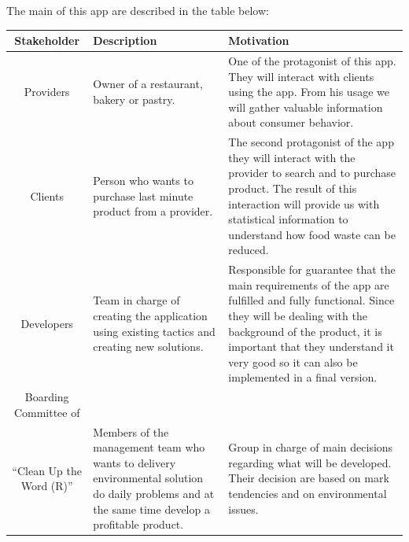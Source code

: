 The main  of this app are described in the table below:

\begin{table}[H]
    \begin{tabularx}{\textwidth}{cXX}
    \toprule
    Stakeholder & Description & Motivation  \\
    \midrule
    Providers & Owner of a restaurant, bakery or pastry. & One of the protagonist of this app. They will interact
    with clients using the app. From his usage we will gather valuable information about consumer behavior. \\
    Clients & Person who wants to purchase last minute product from a provider. & The second protagonist of the app
    they will interact with the provider to search and to purchase product. The result of this interaction will
    provide us with statistical information to understand how food waste can be reduced.  \\
    Developers & Team in charge of creating the application using existing tactics and creating new solutions.
    & Responsible for guarantee that the main requirements of the app are fulfilled and fully functional. 
    Since they will be dealing with the background of the product, it is important that they understand it very
    good so it can also be implemented in a final version.\\
    Boarding Committee of \\ ``Clean Up the Word (R)'' & Members of the management team who wants to delivery 
    environmental solution do daily problems and at the same time develop a profitable product.
    & Group in charge of main decisions regarding what will be developed. Their decision are based on mark tendencies
    and on environmental issues.  \\
    \bottomrule
    \end{tabularx}
\end{table}